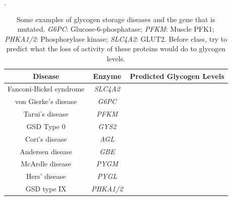 \documentclass{tufte-handout}
\begin{document}
\begin{table}
\centering
\caption{Some examples of glycogen storage diseases and the gene that is mutated.  \textit{G6PC}: Glucose-6-phosphatase; \textit{PFKM}: Muscle PFK1; \textit{PHKA1/2}: Phosphorylase kinase; \textit{SLC4A2}: GLUT2.  Before class, try to predict what the loss of activity of these proteins would do to glycogen levels.}.
\label{tab:glycogen-storage-diseases}
\begin{tabular}{ccc}
\hline
\textbf {Disease} & \textbf{Enzyme} & \textbf{Predicted Glycogen Levels} \\
\hline
Fanconi-Bickel syndrome & \textit{SLC4A2} & \\
von Gierke's disease & \textit{G6PC} & \\
Tarui's disease & \textit{PFKM} & \\
GSD Type 0 & \textit{GYS2} & \\
Cori's disease & \textit{AGL} & \\
Andersen disease & \textit{GBE} & \\
McArdle disease& \textit{PYGM} & \\
Hers' disease & \textit{PYGL} & \\
GSD type IX & \textit{PHKA1/2} & \\
\hline
\end{tabular}
\end{table}




\end{document}
